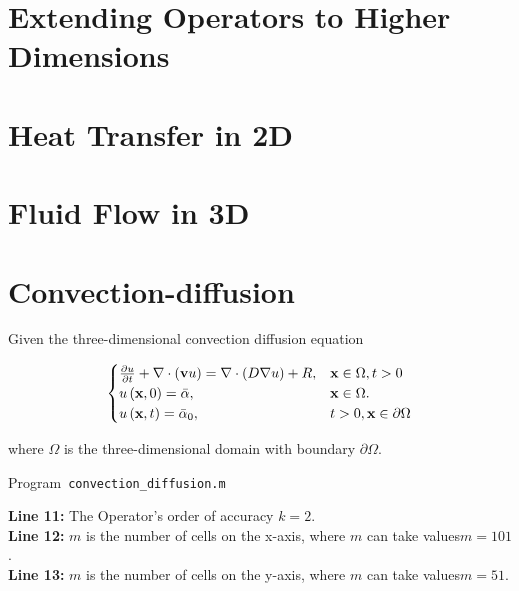 \section{Extending Operators to Higher Dimensions}

\section{Heat Transfer in 2D}

\section{Fluid Flow in 3D}

\section{Convection-diffusion}
Given the three-dimensional convection diffusion equation

\begin{equation}\label{eq:IBVP3d}
    \begin{cases}
        \diffp{u}{t} + \nabla \cdot (\textbf{v} u) = \nabla \cdot (D \nabla u) + R,
                                      & \textbf{x} \in \Omega, t > 0     \\
        u\left( \textbf{x},0\right)= \bar{\alpha},
                                      & \textbf{x} \in  \Omega.\\
        u\left(\textbf{x},t\right)= \bar{\alpha}_{0}, & t >0, \textbf{x} \in \partial  \Omega
    \end{cases}
\end{equation}

where  $\Omega$  is the three-dimensional domain with  boundary $\partial  \Omega $.

\begin{listing}[ht!]
    \tiny
    \centering
    \caption{Program~\texttt{convection\_diffusion.m}}
    \label{code:convection_diffusion.m}
\end{listing}

\textbf{Line 11:} The Operator's order of accuracy $k = 2$.\\

\textbf{Line 12:} $m$ is the number of cells on the x-axis, where $m$ can take values ​​$m= 101$.\\

\textbf{Line 13:} $m$ is the number of cells on the y-axis, where $m$ can take values ​​$m= 51$.\\

